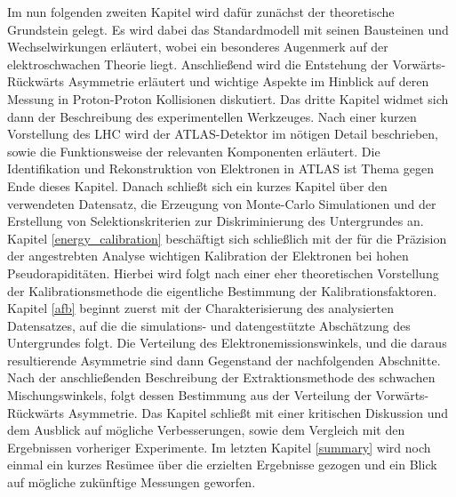 Im nun folgenden zweiten Kapitel wird dafür zunächst der theoretische
Grundstein gelegt. Es wird dabei das Standardmodell mit seinen Bausteinen und
Wechselwirkungen erläutert, wobei ein besonderes Augenmerk auf der
elektroschwachen Theorie liegt. Anschließend wird die Entstehung der
Vorwärts-Rückwärts Asymmetrie erläutert und wichtige Aspekte im Hinblick auf
deren Messung in Proton-Proton Kollisionen diskutiert. Das dritte Kapitel
widmet sich dann der Beschreibung des experimentellen Werkzeuges. Nach einer
kurzen Vorstellung des \acf{LHC} wird der ATLAS-Detektor im nötigen Detail
beschrieben, sowie die Funktionsweise der relevanten Komponenten erläutert.
Die Identifikation und Rekonstruktion von Elektronen in ATLAS ist Thema gegen
Ende dieses Kapitel. Danach schließt sich ein kurzes Kapitel über den
verwendeten Datensatz, die Erzeugung von Monte-Carlo Simulationen und der
Erstellung von Selektionskriterien zur Diskriminierung des Untergrundes an.
Kapitel \ref{energy_calibration} beschäftigt sich schließlich mit der für die
Präzision der angestrebten Analyse wichtigen Kalibration der Elektronen bei
hohen Pseudorapiditäten. Hierbei wird folgt nach einer eher theoretischen
Vorstellung der Kalibrationsmethode die eigentliche Bestimmung der
Kalibrationsfaktoren. Kapitel \ref{afb} beginnt zuerst mit der
Charakterisierung des analysierten Datensatzes, auf die die simulations- und
datengestützte Abschätzung des Untergrundes folgt. Die Verteilung des
Elektron\-emissionswinkels, und die daraus resultierende Asymmetrie sind dann
Gegenstand der nachfolgenden Abschnitte. Nach der anschließenden Beschreibung
der Extraktionsmethode des schwachen Mischungswinkels, folgt dessen Bestimmung
aus der Verteilung der Vorwärts-Rückwärts Asymmetrie. Das Kapitel schließt mit
einer kritischen Diskussion und dem Ausblick auf mögliche Verbesserungen, sowie
dem Vergleich mit den Ergebnissen vorheriger Experimente. Im letzten Kapitel
\ref{summary} wird noch einmal ein kurzes Resümee über die erzielten
Ergebnisse gezogen und ein Blick auf mögliche zukünftige Messungen geworfen.

